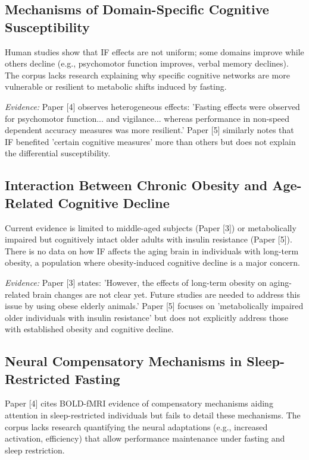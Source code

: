 \documentclass[11pt]{article}
\begin{document}
\subsection{Mechanisms of Domain-Specific Cognitive Susceptibility}
Human studies show that IF effects are not uniform; some domains improve while others decline (e.g., psychomotor function improves, verbal memory declines). The corpus lacks research explaining why specific cognitive networks are more vulnerable or resilient to metabolic shifts induced by fasting.

\textit{Evidence:} Paper [4] observes heterogeneous effects: 'Fasting effects were observed for psychomotor function... and vigilance... whereas performance in non-speed dependent accuracy measures was more resilient.' Paper [5] similarly notes that IF benefited 'certain cognitive measures' more than others but does not explain the differential susceptibility.

\subsection{Interaction Between Chronic Obesity and Age-Related Cognitive Decline}
Current evidence is limited to middle-aged subjects (Paper [3]) or metabolically impaired but cognitively intact older adults with insulin resistance (Paper [5]). There is no data on how IF affects the aging brain in individuals with long-term obesity, a population where obesity-induced cognitive decline is a major concern.

\textit{Evidence:} Paper [3] states: 'However, the effects of long-term obesity on aging-related brain changes are not clear yet. Future studies are needed to address this issue by using obese elderly animals.' Paper [5] focuses on 'metabolically impaired older individuals with insulin resistance' but does not explicitly address those with established obesity and cognitive decline.

\subsection{Neural Compensatory Mechanisms in Sleep-Restricted Fasting}
Paper [4] cites BOLD-fMRI evidence of compensatory mechanisms aiding attention in sleep-restricted individuals but fails to detail these mechanisms. The corpus lacks research quantifying the neural adaptations (e.g., increased activation, efficiency) that allow performance maintenance under fasting and sleep restriction.
\end{document}
